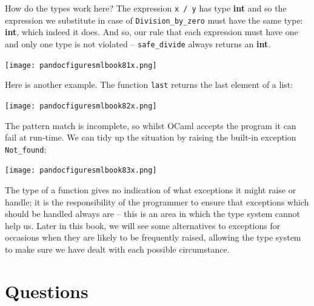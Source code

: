 \documentclass[]{book}
\begin{document}
How do the types work here? The expression \texttt{x / y} has type \textsf{\textbf{int}} and so the expression we substitute in case of \texttt{Division\_by\_zero} must have the same type: \textsf{\textbf{int}}, which indeed it does. And so, our rule that each expression must have one and only one type is not violated -- \texttt{safe\_divide} always returns an \textsf{\textbf{int}}. 

\medskip
\begin{center}
\noindent\texttt{[image: pandocfiguresmlbook81x.png]}
\end{center}
\medskip

\noindent Here is another example. The function \texttt{last} returns the last element of a list:

\medskip
\begin{center}
\noindent\texttt{[image: pandocfiguresmlbook82x.png]}
\end{center}
\medskip

\noindent The pattern match is incomplete, so whilst OCaml accepts the program it can fail at run-time. We can tidy up the situation by raising the built-in exception \texttt{Not\_found}:

\medskip
\begin{center}
\noindent\texttt{[image: pandocfiguresmlbook83x.png]}
\end{center}
\medskip

\noindent  The type of a function gives no indication of what exceptions it might raise or handle; it is the responsibility of the programmer to ensure that exceptions which should be handled always are -- this is an area in which the type system cannot help us. Later in this book, we will see some alternatives to exceptions for occasions when they are likely to be frequently raised, allowing the type system to make sure we have dealt with each possible circumstance.

\clearpage
\section*{Questions}
\end{document}
